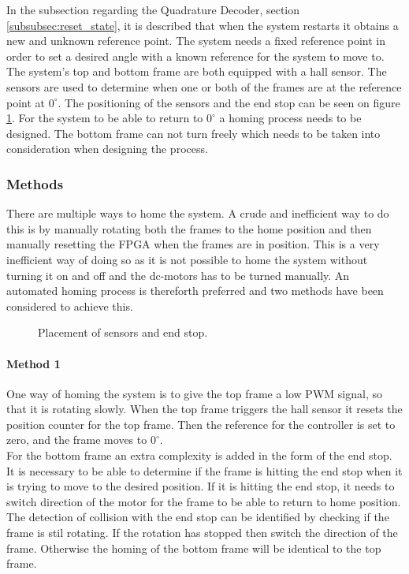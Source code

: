 \documentclass[../../../main]{subfiles}
\begin{document}
In the subsection regarding the Quadrature Decoder, section \ref{subsubsec:reset_state}, it is described that when the system restarts it obtains a new and unknown reference point.
The system needs a fixed reference point in order to set a desired angle with a known reference for the system to move to. \\
The system's top and bottom frame are both equipped with a hall sensor.
The sensors are used to determine when one or both of the frames are at the reference point at $0^\circ$. The positioning of the sensors and the end stop can be seen on figure \ref{fig:homing_system}.
For the system to be able to return to $0^\circ$ a homing process needs to be designed.
The bottom frame can not turn freely which needs to be taken into consideration when designing the process.
\subsubsection{Methods}
There are multiple ways to home the system. A crude and inefficient way to do this is by manually rotating both the frames to the home position and then manually resetting the FPGA when the frames are in position.
This is a very inefficient way of doing so as it is not possible to home the system without turning it on and off and the dc-motors has to be turned manually.
An automated homing process is thereforth preferred and two methods have been considered to achieve this.

\begin{figure}[H]
  \centering
  \def\svgwidth{\textwidth}
  
  \caption{Placement of sensors and end stop.}
  \label{fig:homing_system}
\end{figure}

\paragraph{Method 1}%
\label{par:method_1}
One way of homing the system is to give the top frame a low PWM signal, so that it is rotating slowly.
When the top frame triggers the hall sensor it resets the position counter for the top frame.
Then the reference for the controller is set to zero, and the frame moves to $0^\circ$. 
\\
For the bottom frame an extra complexity is added in the form of the end stop. It is necessary to be able to determine if the frame is hitting the end stop when it is trying to move to the desired position.
If it is hitting the end stop, it needs to switch direction of the motor for the frame to be able to return to home position.
The detection of collision with the end stop can be identified by checking if the frame is stil rotating. If the rotation has stopped then switch the direction of the frame.
Otherwise the homing of the bottom frame will be identical to the top frame.
\end{document}
